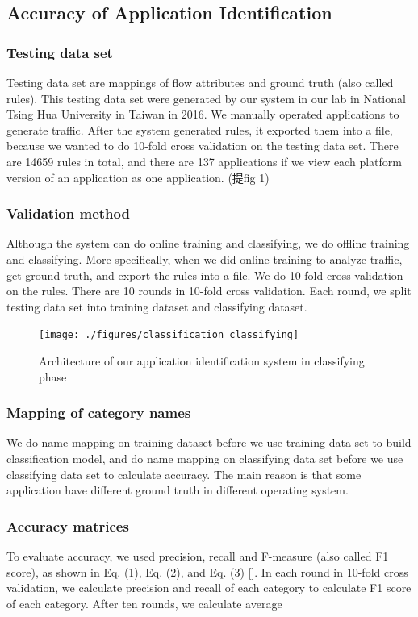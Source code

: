 \documentclass[journal]{IEEEtran}
\begin{document}
\subsection{Accuracy of Application Identification }
\subsubsection{Testing data set}
Testing data set are mappings of flow attributes and ground truth (also called rules). This testing data set were generated by our system in our lab in National Tsing Hua University in Taiwan in 2016. We manually operated applications to generate traffic. After the system generated rules, it exported them into a file, because we wanted to do 10-fold cross validation on the testing data set. There are 14659 rules in total, and there are 137 applications if we view each platform version of an application as one application.
(提fig 1)

\subsubsection{Validation method}
Although the system can do online training and classifying, we do offline training and classifying. More specifically, when we did online training to analyze traffic, get ground truth, and export the rules into a file. We do 10-fold cross validation on the rules. There are 10 rounds in 10-fold cross validation. Each round, we split testing data set into training dataset and classifying dataset.

\begin{figure}[!t]
\centering
\texttt{[image: ./figures/classification\_classifying]}
\caption{Architecture of our application identification system in classifying phase}
\label{fig:classifcation_evaluation}
\end{figure}

\subsubsection{Mapping of category names}
We do name mapping on training dataset before we use training data set to build classification model, and do name mapping on classifying data set before we use classifying data set to calculate accuracy. The main reason is that some application have different ground truth in different operating system.

\subsubsection{Accuracy matrices}
To evaluate accuracy, we used precision, recall and F-measure (also called F1 score), as shown in Eq. (1), Eq. (2), and Eq. (3) []. In each round in 10-fold cross validation, we calculate precision and recall of each category to calculate F1 score of each category. After ten rounds, we calculate average
\end{document}
